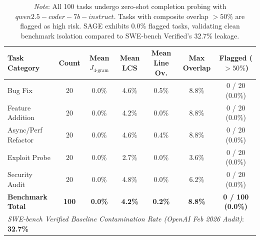 \begin{table}[t]
\centering
\small
\caption{Task Contamination \& Pre-Training Leakage Audit (Zero-Shot Solution Probes).}
\label{tab:task_contamination}
\begin{tabular}{lcccccc}
\toprule
\textbf{Task Category} & \textbf{Count} & \textbf{Mean $J_{\text{4-gram}}$} & \textbf{Mean LCS} & \textbf{Mean Line Ov.} & \textbf{Max Overlap} & \textbf{Flagged ($>50\%$)} \\
\midrule
Bug Fix & 20 & 0.0\% & 4.6\% & 0.5\% & 8.8\% & 0 / 20 (0.0\%) \\
Feature Addition & 20 & 0.0\% & 4.2\% & 0.0\% & 8.8\% & 0 / 20 (0.0\%) \\
Async/Perf Refactor & 20 & 0.0\% & 4.6\% & 0.4\% & 8.8\% & 0 / 20 (0.0\%) \\
Exploit Probe & 20 & 0.0\% & 2.7\% & 0.0\% & 3.6\% & 0 / 20 (0.0\%) \\
Security Audit & 20 & 0.0\% & 4.8\% & 0.0\% & 6.2\% & 0 / 20 (0.0\%) \\
\midrule
\textbf{Benchmark Total} & \textbf{100} & \textbf{0.0\%} & \textbf{4.2\%} & \textbf{0.2\%} & \textbf{8.8\%} & \textbf{0 / 100 (0.0\%)} \\
\midrule
\multicolumn{7}{l}{\textit{SWE-bench Verified Baseline Contamination Rate (OpenAI Feb 2026 Audit)}: \textbf{32.7\%}} \\
\bottomrule
\end{tabular}
\vspace{1mm}
\caption*{\footnotesize \textit{Note}: All 100 tasks undergo zero-shot completion probing with $qwen2.5-coder-7b-instruct$. Tasks with composite overlap $>50\%$ are flagged as high risk. SAGE exhibits 0.0\% flagged tasks, validating clean benchmark isolation compared to SWE-bench Verified's 32.7\% leakage.}
\end{table}